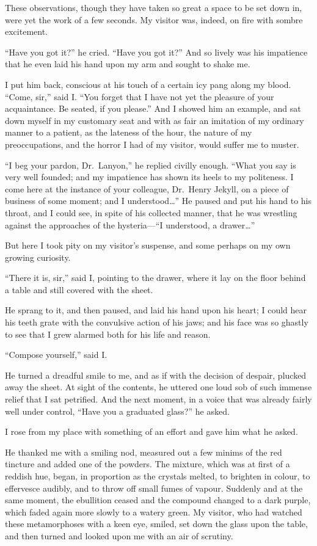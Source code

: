 \documentclass[12pt,openright]{book}
\begin{document}
These observations, though they have taken so great a space to be set down in, were yet the work of a few seconds. My visitor was, indeed, on fire with sombre excitement.

“Have you got it?” he cried. “Have you got it?” And so lively was his impatience that he even laid his hand upon my arm and sought to shake me.

I put him back, conscious at his touch of a certain icy pang along my blood. “Come, sir,” said I. “You forget that I have not yet the pleasure of your acquaintance. Be seated, if you please.” And I showed him an example, and sat down myself in my customary seat and with as fair an imitation of my ordinary manner to a patient, as the lateness of the hour, the nature of my preoccupations, and the horror I had of my visitor, would suffer me to muster.

“I beg your pardon, Dr. Lanyon,” he replied civilly enough. “What you say is very well founded; and my impatience has shown its heels to my politeness. I come here at the instance of your colleague, Dr. Henry Jekyll, on a piece of business of some moment; and I understood…” He paused and put his hand to his throat, and I could see, in spite of his collected manner, that he was wrestling against the approaches of the hysteria—“I understood, a drawer…”

But here I took pity on my visitor’s suspense, and some perhaps on my own growing curiosity.

“There it is, sir,” said I, pointing to the drawer, where it lay on the floor behind a table and still covered with the sheet.

He sprang to it, and then paused, and laid his hand upon his heart; I could hear his teeth grate with the convulsive action of his jaws; and his face was so ghastly to see that I grew alarmed both for his life and reason.

“Compose yourself,” said I.

He turned a dreadful smile to me, and as if with the decision of despair, plucked away the sheet. At sight of the contents, he uttered one loud sob of such immense relief that I sat petrified. And the next moment, in a voice that was already fairly well under control, “Have you a graduated glass?” he asked.

I rose from my place with something of an effort and gave him what he asked.

He thanked me with a smiling nod, measured out a few minims of the red tincture and added one of the powders. The mixture, which was at first of a reddish hue, began, in proportion as the crystals melted, to brighten in colour, to effervesce audibly, and to throw off small fumes of vapour. Suddenly and at the same moment, the ebullition ceased and the compound changed to a dark purple, which faded again more slowly to a watery green. My visitor, who had watched these metamorphoses with a keen eye, smiled, set down the glass upon the table, and then turned and looked upon me with an air of scrutiny.
\end{document}
